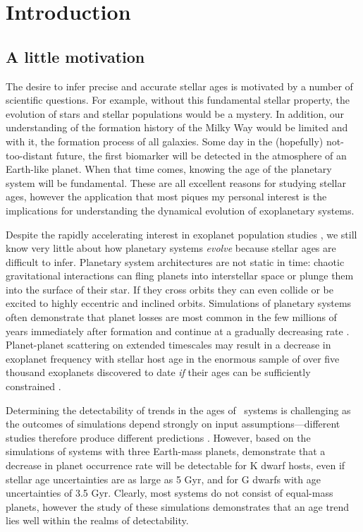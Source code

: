 \chapter{Introduction}
\label{chapter:intro}
\section{A little motivation}

The desire to infer precise and accurate stellar ages is motivated by a number
of scientific questions.
For example, without this fundamental stellar property, the evolution of stars
and stellar populations would be a mystery.
In addition, our understanding of the formation history of the Milky Way would
be limited and with it, the formation process of all galaxies.
Some day in the (hopefully) not-too-distant future, the first biomarker will
be detected in the atmosphere of an Earth-like planet.
When that time comes, knowing the age of the planetary system will be
fundamental.
These are all excellent reasons for studying stellar ages, however the
application that most piques my personal interest is the implications for
understanding the dynamical evolution of exoplanetary systems.

Despite the rapidly accelerating interest in exoplanet population studies
\citep[e.g.][]{Petigura2013, Foreman-Mackey2014, Dressing2015, Burke2015}, we
still know very little about how planetary systems {\it evolve} because
stellar ages are difficult to infer.
Planetary system architectures are not static in time: chaotic gravitational
interactions can fling planets into interstellar space or plunge them into the
surface of their star.
If they cross orbits they can even collide or be excited to highly eccentric
and inclined orbits.
Simulations of planetary systems often demonstrate that planet losses are most
common in the few millions of years immediately after formation and continue
at a gradually decreasing rate \citep[e.g.][]{Zhou2007, Smith2009, Funk2010,
Pu2015}.
Planet-planet scattering on extended timescales may result in a decrease in
exoplanet frequency with stellar host age in the enormous sample of over five
thousand exoplanets discovered to date {\it if} their ages can be sufficiently
constrained \citep{Veras2015}.

Determining the detectability of trends in the ages of \Kepler\ systems is
challenging as the outcomes of simulations depend strongly on input
assumptions---different studies therefore produce different predictions
\citep[see figure 3 of][]{Pu2015}.
However, based on the \citet{Smith2009} simulations of systems with three
Earth-mass planets, \citet{Veras2015} demonstrate that a decrease in planet
occurrence rate will be detectable for K dwarf hosts, even if stellar age
uncertainties are as large as 5 Gyr, and for G dwarfs with age uncertainties of
3.5 Gyr.
Clearly, most systems do not consist of equal-mass planets, however the study
of these simulations demonstrates that an age trend lies well within the
realms of detectability.

